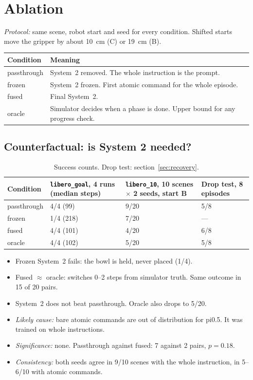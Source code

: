 \documentclass[10pt,a4paper]{article}
\newcommand{\key}[1]{#1}%
\begin{document}
\section{Ablation}
\emph{Protocol:} same scene, robot start and seed for every condition. Shifted starts move the gripper by about 10~cm (C) or 19~cm (B).
\begin{table}[h]
\centering\footnotesize
\begin{tabularx}{\linewidth}{@{}lX@{}}
\toprule
Condition & Meaning\\
\midrule
passthrough & System~2 removed. The whole instruction is the prompt.\\
frozen & System~2 frozen. First atomic command for the whole episode.\\
fused & Final System~2.\\
oracle & Simulator decides when a phase is done. Upper bound for any progress check.\\
\bottomrule
\end{tabularx}
\end{table}

\subsection{Counterfactual: is System 2 needed?}
\begin{table}[h]
\centering\footnotesize
\begin{tabularx}{\linewidth}{lYYY}
\toprule
Condition & \texttt{libero\_goal}, 4 runs (median steps) & \texttt{libero\_10}, 10 scenes $\times$ 2 seeds, start B & Drop test, 8 episodes\\
\midrule
passthrough & 4/4 (99) & \key{9/20} & 5/8\\
frozen & 1/4 (218) & 7/20 & ---\\
fused & 4/4 (101) & 4/20 & 6/8\\
oracle & 4/4 (102) & 5/20 & 5/8\\
\bottomrule
\end{tabularx}
\caption{Success counts. Drop test: section~\ref{sec:recovery}.}
\label{tab:main}
\end{table}
\begin{itemize}
\item \key{Frozen System~2 fails:} the bowl is held, never placed (1/4).
\item \key{Fused $\approx$ oracle:} switches 0--2 steps from simulator truth. Same outcome in 15 of 20 pairs.
\item \key{System~2 does not beat passthrough.} Oracle also drops to 5/20.
\item \emph{Likely cause:} bare atomic commands are out of distribution for pi0.5. It was trained on whole instructions.
\item \emph{Significance:} none. Passthrough against fused: 7 against 2 pairs, $p{=}0.18$.
\item \emph{Consistency:} both seeds agree in 9/10 scenes with the whole instruction, in 5--6/10 with atomic commands.
\end{itemize}
\end{document}
